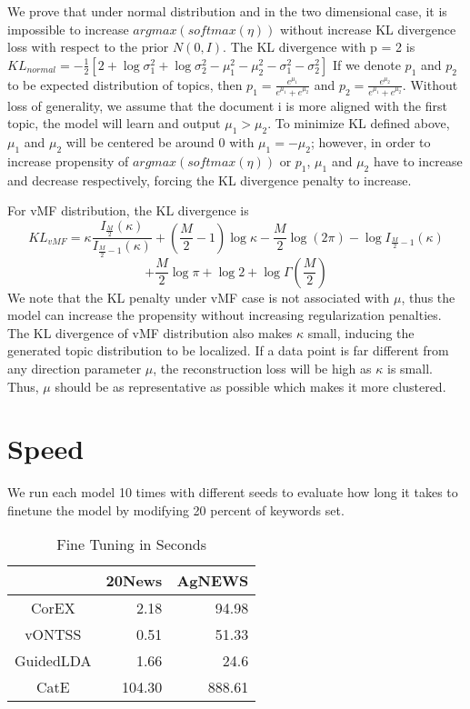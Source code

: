 \documentclass[11pt]{article}
\begin{document}
We prove that under normal distribution and in the two dimensional case, it is impossible to increase $argmax(softmax(\eta))$ without increase KL divergence loss with respect to the prior $N(0,I)$. The KL divergence with p = 2 is $KL_{normal} = -\frac{1}{2}[2 + \log\sigma^{2}_{1} + \log\sigma^{2}_{2} - \mu^{2}_{1} - \mu^{2}_{2} - \sigma^{2}_{1} - \sigma^{2}_{2}]$
If we denote $p_{1}$ and $p_{2}$ to be expected distribution of topics, then $p_{1} = \frac{e^{\mu_{1}}}{e^{\mu_{1}} + e^{\mu_{2}}}$ and $p_{2} = \frac{e^{\mu_{2}}}{e^{\mu_{1}} + e^{\mu_{2}}}$. Without loss of generality, we assume that the document i is more aligned with the first topic, the model will learn and output $\mu_{1} > \mu_{2}$. To minimize KL defined above, $\mu_{1}$ and $\mu_{2}$ will be centered be around 0 with $\mu_{1} = -\mu_{2}$; however, in order to increase propensity of $argmax(softmax(\eta))$ or $p_{1}$, $\mu_{1}$ and $\mu_{2}$ have to increase and decrease respectively, forcing the KL divergence penalty to increase.

For vMF distribution, the KL divergence is
$$KL_{vMF} = \kappa\frac{I_{\frac{M}{2}}(\kappa)}{I_{\frac{M}{2}-1}(\kappa)} + (\frac{M}{2} - 1) \log \kappa - \frac{M}{2} \log (2\pi)  - \log I_{\frac{M}{2}-1}(\kappa) $$ $$+ \frac{M}{2} \log \pi + \log 2 + \log \Gamma(\frac{M}{2})$$
We note that the KL penalty under vMF case is not associated with $\mu$, thus the model can increase the propensity without increasing regularization penalties. The KL divergence of vMF
distribution also makes $\kappa$ small, inducing the generated topic
distribution to be localized. If a data point is far different
from any direction parameter $\mu$, the reconstruction loss will
be high as $\kappa$ is small. Thus, $\mu$ should be as representative as
possible which makes it more clustered.


\section{Speed}
We run each model 10 times with different seeds to evaluate how long it takes to finetune the model by modifying 20 percent of keywords set. 
\begin{table*}[ ]

\centering
\begin{tabular}{| c| r| r } 
\hline
\multicolumn{1}{c}{} \vline &
\multicolumn{1}{c}{20News}\vline  & \multicolumn{1}{c}{AgNEWS} \vline \\
\hline
\multicolumn{1}{c}{CorEX} \vline & 2.18 &  94.98\\
\multicolumn{1}{c}{vONTSS} \vline & 0.51 &  51.33 \\
\multicolumn{1}{c}{GuidedLDA} \vline & 1.66 & 24.6 \\
\multicolumn{1}{c}{CatE} \vline & 104.30 & 888.61\\
\hline
\end{tabular}
\caption{\label{speed:tab}Fine Tuning in Seconds}
\end{table*}
\end{document}
